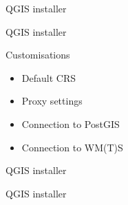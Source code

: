 \begin{frame}{QGIS installer}
	
\end{frame}

\begin{frame}{QGIS installer}
	\begin{block}{Customisations}
		\begin{itemize}
			\item Default CRS
			\item Proxy settings
			\item Connection to PostGIS
			\item Connection to WM(T)S
		\end{itemize}
	\end{block}
	
\end{frame}

\begin{frame}{QGIS installer}
	
\end{frame}
\begin{frame}{QGIS installer}
	
\end{frame}

